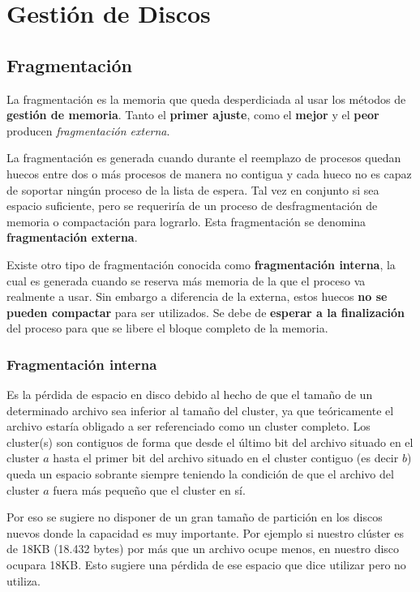 \documentclass[10pt,a4paper]{article}
\begin{document}
\section{Gestión de Discos}
\subsection{Fragmentación}

La fragmentación es la memoria que queda desperdiciada al usar los métodos de \textbf{gestión de memoria}. Tanto el \textbf{primer ajuste}, como el \textbf{mejor} y el \textbf{peor} producen \textit{fragmentación externa}.

La fragmentación es generada cuando durante el reemplazo de procesos quedan huecos entre dos o más procesos de manera no contigua y cada hueco no es capaz de soportar ningún proceso de la lista de espera. Tal vez en conjunto si sea espacio suficiente, pero se requeriría de un proceso de desfragmentación de memoria o compactación para lograrlo. Esta fragmentación se denomina \textbf{fragmentación externa}.

Existe otro tipo de fragmentación conocida como \textbf{fragmentación interna}, la cual es generada cuando se reserva más memoria de la que el proceso va realmente a usar. Sin embargo a diferencia de la externa, estos huecos \textbf{no se pueden compactar} para ser utilizados. Se debe de \textbf{esperar a la finalización} del proceso para que se libere el bloque completo de la memoria.

\subsubsection{Fragmentación interna}
Es la pérdida de espacio en disco debido al hecho de que el tamaño de un determinado archivo sea inferior al tamaño del cluster, ya que teóricamente el archivo estaría obligado a ser referenciado como un cluster completo. Los cluster(s) son contiguos de forma que desde el último bit del archivo situado en el cluster $a$ hasta el primer bit del archivo situado en el cluster contiguo (es decir $b$) queda un espacio sobrante siempre teniendo la condición de que el archivo del cluster $a$ fuera más pequeño que el cluster en sí.

Por eso se sugiere no disponer de un gran tamaño de partición en los discos nuevos donde la capacidad es muy importante. Por ejemplo si nuestro clúster es de 18KB (18.432 bytes) por más que un archivo ocupe menos, en nuestro disco ocupara 18KB. Esto sugiere una pérdida de ese espacio que dice utilizar pero no utiliza.
\end{document}
